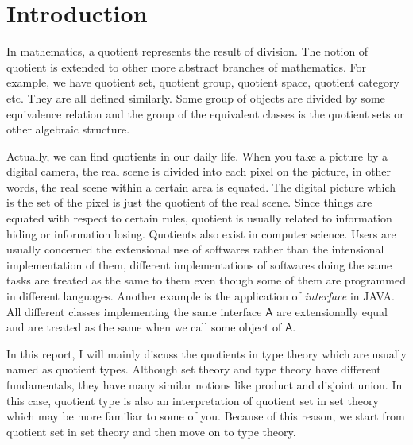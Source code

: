 \documentclass{article}
\newcommand{\Conid}[1]{\mathit{#1}}
\newcommand{\Varid}[1]{\mathit{#1}}
\renewcommand\Varid[1]{\mathord{\textsf{#1}}}
\let\Conid\Varid
\theoremstyle{definition}
\begin{document}
\begin{abstract}

\end{abstract}


\section{Introduction}


In mathematics, a quotient represents the result of division. The
notion of quotient is extended to other more abstract branches of mathematics. For example, we
have quotient set, quotient group, quotient space, quotient category
etc. They are all defined similarly. Some group of objects are divided
by some equivalence relation and the group of the equivalent classes
is the quotient sets or other algebraic structure.

Actually, we can find quotients in our daily life. When you take a
picture by a digital camera, the real scene is divided into each pixel
on the picture, in other words, the real scene within a certain area is
equated. The digital picture which is the set of the pixel is just the
quotient of the real scene. Since things are equated
with respect to certain rules, quotient is usually related to
information hiding or information losing. Quotients also exist in
computer science. Users are usually concerned the extensional use of
softwares rather than the intensional implementation of them,
different implementations of softwares doing the same tasks are
treated as the same to them even though 
some of them are programmed in different languages. Another example is
the application of \emph{interface} in JAVA. All different classes implementing the same
interface \ensuremath{\Conid{A}} are extensionally equal and are treated as the same when
we call some object of \ensuremath{\Conid{A}}.

In this report, I will mainly discuss the quotients in type theory
which are usually named as quotient types. Although set theory and
type theory have different fundamentals, they have many similar
notions like product and disjoint union.  In this case, quotient type
is also an interpretation of quotient set in set theory which may be
more familiar to some of you. Because of this reason, we start from
quotient set in set theory and then move on to type theory.
\end{document}
